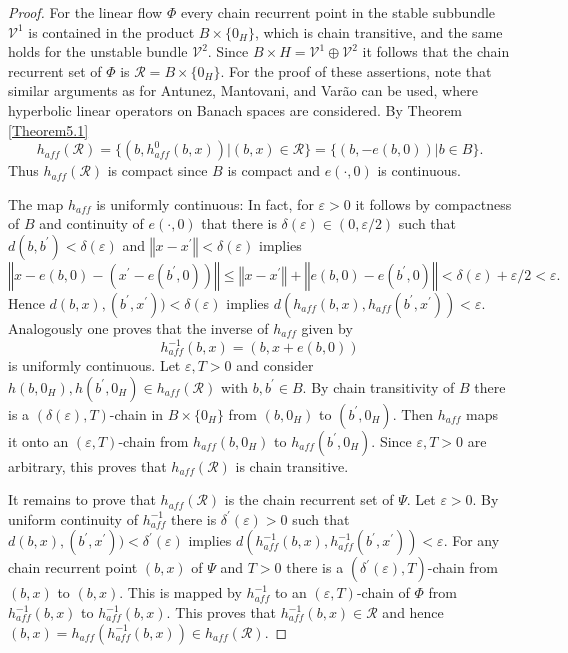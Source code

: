 	\begin{proof}
		For the linear flow $\Phi$ every chain recurrent point in the stable subbundle
		$\mathcal{V}^{1}$ is contained in the product $B\times\{0_{H}\}$, which is
		chain transitive, and the same holds for the unstable bundle $\mathcal{V}^{2}%
		$. Since $B\times H=\mathcal{V}^{1}\oplus\mathcal{V}^{2}$ it follows that the
		chain recurrent set of $\Phi$ is $\mathcal{R}=B\times\{0_{H}\}$. For the proof
		of these assertions, note that similar arguments as for Antunez, Mantovani,
		and Var\~{a}o \cite[Corollary 2.11]{Antunez} can be used, where hyperbolic
		linear operators on Banach spaces are considered. By Theorem \ref{Theorem5.1}
		\[
		h_{aff}(\mathcal{R})=\{(b,h_{aff}^{0}(b,x))\left\vert (b,x)\in\mathcal{R}%
		\right.  \}=\{(b,-e(b,0))\left\vert b\in B\right.  \}.
		\]
		Thus $h_{aff}(\mathcal{R})$ is compact since $B$ is compact and $e(\cdot,0)$
		is continuous.
		
		The map $h_{aff}$ is uniformly continuous: In fact, for $\varepsilon>0$ it
		follows by compactness of $B$ and continuity of $e(\cdot,0)$ that there is
		$\delta(\varepsilon)\in(0,\varepsilon/2)$ such that $d(b,b^{\prime}%
		)<\delta(\varepsilon)$ and $\left\Vert x-x^{\prime}\right\Vert <\delta
		(\varepsilon)$ implies
		\[
		\left\Vert x-e(b,0)-\left(  x^{\prime}-e(b^{\prime},0)\right)  \right\Vert
		\leq\left\Vert x-x^{\prime}\right\Vert +\left\Vert e(b,0)-e(b^{\prime
		},0)\right\Vert <\delta(\varepsilon)+\varepsilon/2<\varepsilon.
		\]
		Hence $d(b,x),(b^{\prime},x^{\prime}))<\delta(\varepsilon)$ implies
		$d(h_{aff}(b,x),h_{aff}(b^{\prime},x^{\prime}))<\varepsilon$. Analogously one
		proves that the inverse of $h_{aff}$ given by
		\[
		h_{aff}^{-1}(b,x)=(b,x+e(b,0))
		\]
		is uniformly continuous. Let $\varepsilon,T>0$ and consider $h(b,0_{H}%
		),h(b^{\prime},0_{H})\in h_{aff}(\mathcal{R})$ with $b,b^{\prime}\in B$. By
		chain transitivity of $B$ there is a $(\delta(\varepsilon),T)$-chain in
		$B\times\{0_{H}\}$ from $(b,0_{H})$ to $(b^{\prime},0_{H})$. Then $h_{aff}$
		maps it onto an $(\varepsilon,T)$-chain from $h_{aff}(b,0_{H})$ to
		$h_{aff}(b^{\prime},0_{H})$. Since $\varepsilon,T>0$ are arbitrary, this
		proves that $h_{aff}(\mathcal{R})$ is chain transitive.
		
		It remains to prove that $h_{aff}(\mathcal{R})$ is the chain recurrent set of
		$\Psi$. Let $\varepsilon>0$. By uniform continuity of $h_{aff}^{-1}$ there is
		$\delta^{\prime}(\varepsilon)>0$ such that $d(b,x),(b^{\prime},x^{\prime
		}))<\delta^{\prime}(\varepsilon)$ implies $d(h_{aff}^{-1}(b,x),h_{aff}%
		^{-1}(b^{\prime},x^{\prime}))<\varepsilon$. For any chain recurrent point
		$(b,x)$ of $\Psi$ and $T>0$ there is a $(\delta^{\prime}(\varepsilon
		),T)$-chain from $(b,x)$ to $(b,x)$. This is mapped by $h_{aff}^{-1}$ to an
		$(\varepsilon,T)$-chain of $\Phi$ from $h_{aff}^{-1}(b,x)$ to $h_{aff}%
		^{-1}(b,x)$. This proves that $h_{aff}^{-1}(b,x)\in\mathcal{R}$ and hence
		$(b,x)=h_{aff}(h_{aff}^{-1}(b,x))\in h_{aff}(\mathcal{R})$.
	\end{proof}
	
